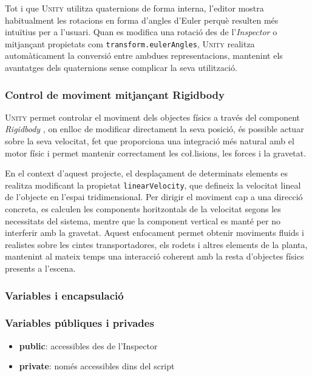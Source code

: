 \documentclass[a4paper,11pt,DIV=13,headings=normal,abstract=true,twoside=semi]{article}
\newcommand{\acro}[1]{\textsc{#1}}
\begin{document}
Tot i que \acro{Unity} utilitza quaternions de forma interna, l'editor mostra habitualment les rotacions en forma d'angles d'Euler perquè resulten més intuïtius per a l'usuari. Quan es modifica una rotació des de l'\emph{Inspector} o mitjançant propietats com \texttt{transform.eulerAngles}, \acro{Unity} realitza automàticament la conversió entre ambdues representacions, mantenint els avantatges dels quaternions sense complicar la seva utilització.


\subsubsection{Control de moviment mitjançant Rigidbody}

\acro{Unity} permet controlar el moviment dels objectes físics a través del component \emph{Rigidbody} \cite{UnityRigidbody}, on enlloc de modificar directament la seva posició, és possible actuar sobre la seva velocitat, fet que proporciona una integració més natural amb el motor físic i permet mantenir correctament les co\l.lisions, les forces i la gravetat. 

En el context d'aquest projecte, el desplaçament de determinats elements es realitza modificant la propietat \texttt{linearVelocity}, que defineix la velocitat lineal de l'objecte en l'espai tridimensional. Per dirigir el moviment cap a una direcció concreta, es calculen les components horitzontals de la velocitat segons les necessitats del sistema, mentre que la component vertical es manté per no interferir amb la gravetat.  Aquest enfocament permet obtenir moviments fluids i realistes sobre les cintes transportadores, els rodets i altres elements de la planta, mantenint al mateix temps una interacció coherent amb la resta d'objectes físics presents a l'escena.

\subsubsection{Variables i encapsulació}

\subsubsection*{Variables públiques i privades}

\begin{itemize}
\item \textbf{public}: accessibles des de l'Inspector \cite{MicrosoftFields}
\item \textbf{private}: només accessibles dins del script
\end{itemize}
\end{document}
